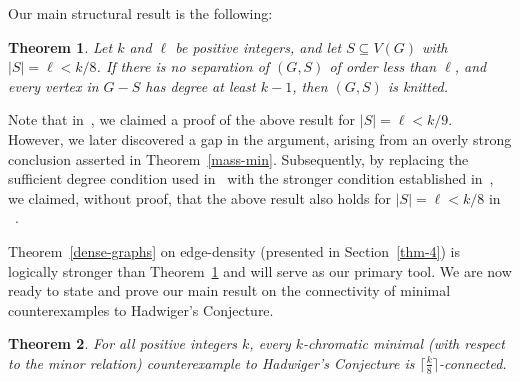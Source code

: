 \documentclass[11pt]{amsart}
\newtheorem{theorem}{Theorem}
\begin{document}
Our main structural result is the following:

\begin{theorem}\label{knitted-theorem}
Let $k$ and $\ell$ be positive integers, and let $S\subseteq V(G)$ with $|S|=\ell<k/8$. If there is no separation of $(G,S)$ of order less than $\ell$, and every vertex in $G-S$ has degree at least $k-1$, then $(G,S)$ is knitted.
\end{theorem}

Note that in~\cite{KY13}, we claimed a proof of the above result for $|S|=\ell<k/9$. However, we later discovered a gap in the argument, arising from an overly strong conclusion asserted in Theorem~\ref{mass-min}. Subsequently, by replacing the sufficient degree condition used in~\cite{KY13} with the stronger condition established in~\cite{LRY19}, we claimed, without proof, that the above result also holds for $|S|=\ell<k/8$ in ~\cite{LRY19}.

Theorem~\ref{dense-graphs} on edge-density (presented in Section~\ref{thm-4}) is logically stronger than Theorem~\ref{knitted-theorem} and will serve as our primary tool. We are now ready to state and prove our main result on the connectivity of minimal counterexamples to Hadwiger's Conjecture.

\begin{theorem}
For all positive integers $k$, every $k$-chromatic minimal (with respect to the minor relation) counterexample to Hadwiger's Conjecture is $\lceil \frac{k}{8}\rceil$-connected.
\end{theorem}
\end{document}
